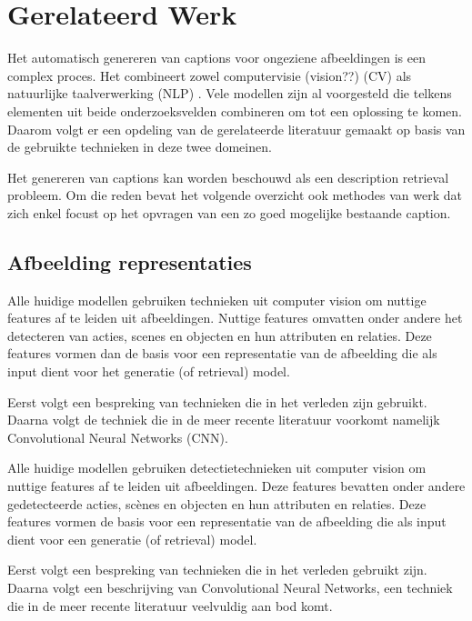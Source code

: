 \chapter{Gerelateerd Werk}
\label{hoofdstuk:related}
Het automatisch genereren van captions voor ongeziene afbeeldingen is een complex proces. Het combineert zowel computervisie (vision??) (CV) als natuurlijke taalverwerking (NLP) . Vele modellen zijn al voorgesteld die telkens elementen uit beide onderzoeksvelden combineren om tot een oplossing te komen. Daarom volgt er een opdeling van de gerelateerde literatuur gemaakt op basis van de gebruikte technieken in deze twee domeinen. 

Het genereren van captions kan worden beschouwd als een description retrieval probleem.\cite{Hodosh2013}  Om die reden bevat het volgende overzicht ook methodes van werk dat zich enkel focust op het opvragen van een zo goed mogelijke bestaande caption.

\section{Afbeelding representaties}
Alle huidige modellen gebruiken technieken uit computer vision om nuttige features af te leiden uit afbeeldingen. Nuttige features omvatten onder andere het detecteren van acties, scenes en objecten en hun attributen en relaties. \cite{Bernardi}  Deze features vormen dan de basis voor een representatie van de afbeelding die als input dient voor het generatie (of retrieval) model. 

Eerst volgt een bespreking van technieken die in het verleden zijn gebruikt. Daarna volgt de techniek die in de meer recente literatuur voorkomt namelijk Convolutional Neural Networks (CNN).

Alle huidige modellen gebruiken detectietechnieken uit computer vision om nuttige features af te leiden uit afbeeldingen. Deze features bevatten onder andere gedetecteerde acties, sc\`enes en objecten en hun attributen en relaties. Deze features vormen de basis voor een representatie van de afbeelding die als input dient voor een generatie (of retrieval) model. 

Eerst volgt een bespreking van technieken die in het verleden gebruikt zijn. Daarna volgt een beschrijving van Convolutional Neural Networks, een techniek die in de meer recente literatuur veelvuldig aan bod komt.

